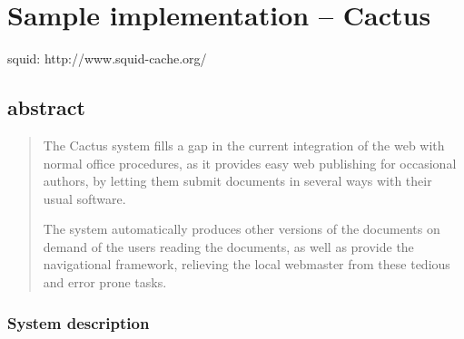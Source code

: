 
\chapter{Sample implementation -- Cactus}
\label{sec:cactus}


squid:  http://www.squid-cache.org/
\section{abstract}

\begin{quotation}
  The Cactus system fills a gap in the current integration of the web
  with normal office procedures, as it provides easy web publishing
  for occasional authors, by letting them submit documents in several
  ways with their usual software.

  The system automatically produces other versions of the documents on
  demand of the users reading the documents, as well as provide the
  navigational framework, relieving the local webmaster from these
  tedious and error prone tasks.  
\end{quotation}

\subsection{System description}


